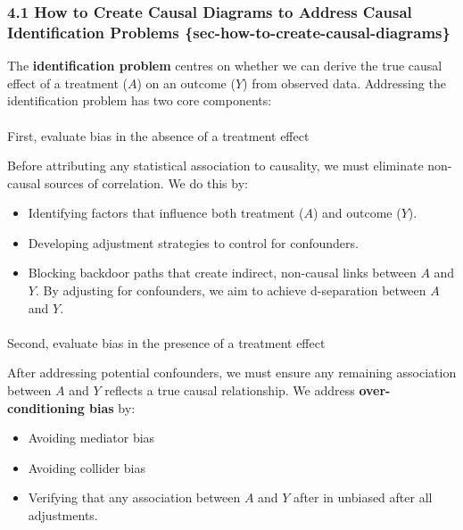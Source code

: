 \documentclass[
  single column]{article}
\makeatletter
\let\oldparagraph\paragraph
\renewcommand{\paragraph}{
    \@ifstar
      \xxxParagraphStar
      \xxxParagraphNoStar
  }
\newcommand{\xxxParagraphStar}[1]{\oldparagraph*{#1}\mbox{}}
\newcommand{\xxxParagraphNoStar}[1]{\oldparagraph{#1}\mbox{}}
\providecommand{\tightlist}{%
  \setlength{\itemsep}{0pt}\setlength{\parskip}{0pt}}\usepackage{longtable,booktabs,array}
\makeatother
\begin{document}
\subsubsection{4.1 How to Create Causal Diagrams to Address Causal
Identification Problems
\{sec-how-to-create-causal-diagrams\}}\label{how-to-create-causal-diagrams-to-address-causal-identification-problems-sec-how-to-create-causal-diagrams}

The \textbf{identification problem} centres on whether we can derive the
true causal effect of a treatment (\(A\)) on an outcome (\(Y\)) from
observed data. Addressing the identification problem has two core
components:

\paragraph{First, evaluate bias in the absence of a treatment
effect}\label{first-evaluate-bias-in-the-absence-of-a-treatment-effect}

Before attributing any statistical association to causality, we must
eliminate non-causal sources of correlation. We do this by:

\begin{itemize}
\tightlist
\item
  Identifying factors that influence both treatment (\(A\)) and outcome
  (\(Y\)).
\item
  Developing adjustment strategies to control for confounders.
\item
  Blocking backdoor paths that create indirect, non-causal links between
  \(A\) and \(Y\). By adjusting for confounders, we aim to achieve
  d-separation between \(A\) and \(Y\).
\end{itemize}

\paragraph{Second, evaluate bias in the presence of a treatment
effect}\label{second-evaluate-bias-in-the-presence-of-a-treatment-effect}

After addressing potential confounders, we must ensure any remaining
association between \(A\) and \(Y\) reflects a true causal relationship.
We address \textbf{over-conditioning bias} by:

\begin{itemize}
\tightlist
\item
  Avoiding mediator bias
\item
  Avoiding collider bias
\item
  Verifying that any association between \(A\) and \(Y\) after in
  unbiased after all adjustments.
\end{itemize}
\end{document}
